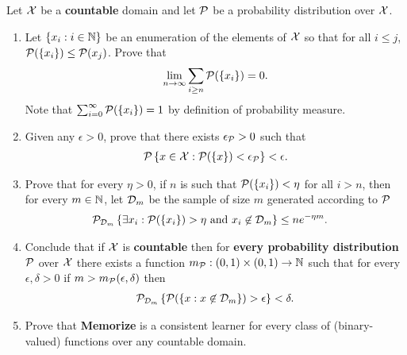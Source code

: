 \documentclass[11pt]{article}
\begin{document}
\begin{itemize}
\begin{exercise}
Let ${\mathcal X}$ be a \textbf{countable} domain and let ${\mathcal P}$ be a probability distribution over ${\mathcal X}$.
\begin{enumerate}
\item Let $\left\{x_i : i \in {\mathbb N}\right\}$ be an enumeration of the elements of ${\mathcal X}$ so that for all $i \le j$, ${\mathcal P}(\left\{x_i\right\}) \le {\mathcal P}({x_j})$. Prove that
\begin{align*}
\lim\limits_{n\rightarrow \infty}\sum_{i \ge n}{\mathcal P}(\left\{x_i\right\}) = 0.
\end{align*} Note that $\sum_{i = 0}^{\infty}{\mathcal P}(\left\{x_i\right\}) = 1$ by definition of probability measure.

\item Given any $\epsilon > 0$, prove that there exists $\epsilon_{{\mathcal P}} > 0$ such that
\begin{align*}
{\mathcal P}\left\{x \in {\mathcal X}: {\mathcal P}(\left\{x\right\}) < \epsilon_{{\mathcal P}}\right\} < \epsilon.
\end{align*}

\item Prove that for every $\eta > 0$, if $n$ is such that ${\mathcal P}(\left\{x_i\right\}) < \eta$ for all $i > n$, then for every $m \in {\mathbb N}$, let ${\mathcal D}_m$ be the sample of  size $m$ generated according to ${\mathcal P}$
\begin{align*}
{\mathcal P}_{{\mathcal D}_{m}}\left\{\exists x_i: {\mathcal P}(\left\{x_i\right\}) > \eta \text{ and }x_i \not\in {\mathcal D}_{m} \right\} &\le n e^{- \eta m}.
\end{align*}

\item Conclude that if ${\mathcal X}$ is \textbf{countable} then for \textbf{every probability distribution} ${\mathcal P}$ over ${\mathcal X}$ there exists a function $m_{{\mathcal P}}: (0,1) \times (0,1) \to {\mathbb N}$ such that for every $\epsilon, \delta > 0$ if $m > m_{{\mathcal P}}(\epsilon, \delta)$ then
\begin{align*}
{\mathcal P}_{{\mathcal D}_{m}}\left\{{\mathcal P}(\left\{x: x\not\in {\mathcal D}_{m}\right\}) > \epsilon \right\} < \delta.
\end{align*}

\item Prove that \textbf{Memorize} is a consistent learner for every class of (binary-valued) functions over any countable domain.
\end{enumerate}
\end{exercise}


\end{itemize}
\end{document}
